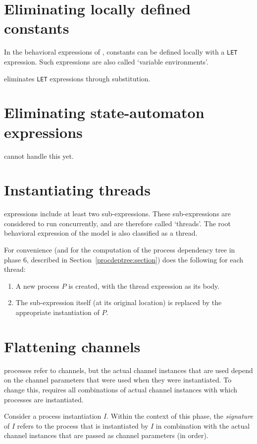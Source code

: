 \section{Eliminating locally defined constants}

In the behavioral expressions of \txs{}, constants can be defined locally with a \texttt{LET} expression.
Such expressions are also called `variable environments'.

\lpeq{} eliminates \texttt{LET} expressions through substitution.

\section{Eliminating state-automaton expressions}

\lpeq{} cannot handle this yet.

\section{Instantiating threads} \label{thread-inst:section}

\pedi{} expressions include at least two sub-expressions.
These sub-expressions are considered to run concurrently, and are therefore called `threads'.
The root behavioral expression of the model is also classified as a thread.

For convenience (and for the computation of the process dependency tree in phase 6, described in Section~\ref{procdeptree:section}) \lpeq{} does the following for each thread:
\begin{enumerate}[1.]
\item A new process $P$ is created, with the thread expression as its body.
\item The sub-expression itself (at its original location) is replaced by the appropriate instantiation of $P$.
\end{enumerate}

\section{Flattening channels}

\txs{} processes refer to channels, but the actual channel instances that are used depend on the channel parameters that were used when they were instantiated.
To change this, \lpeq{} requires all combinations of actual channel instances with which processes are instantiated.

Consider a process instantiation $I$.
Within the context of this phase, the \emph{signature} of $I$ refers to the process that is instantiated by $I$ in combination with the actual channel instances that are passed as channel parameters (in order).

